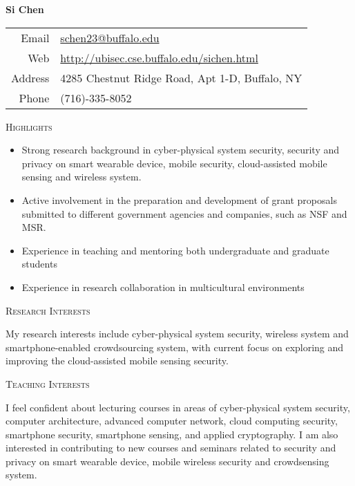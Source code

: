 \documentclass[letter]{article}
\newcommand{\heading}[1]{\item \large \textsc{#1} \normalsize}
\begin{document}
\Huge \textbf{Si Chen} \hfill \small
\begin{tabular}{rl}
Email   & \href{mailto:schen23@buffalo.edu}{schen23@buffalo.edu} \\
Web     & \url{http://ubisec.cse.buffalo.edu/sichen.html} \\
Address & 4285 Chestnut Ridge Road, Apt 1-D, Buffalo, NY\\
Phone  & (716)-335-8052\\
\end{tabular}

\normalsize

\begin{description}

\heading{Highlights}
\begin{itemize}
\item Strong research background in cyber-physical system security, security and privacy on smart wearable device, mobile security, cloud-assisted mobile sensing and wireless system.

\item Active involvement in the preparation and development of grant proposals submitted to different government agencies and companies, such as NSF and MSR.
\item Experience in teaching and mentoring both undergraduate and graduate students
\item Experience in research collaboration in multicultural environments
\end{itemize}


\heading{Research Interests}

My research interests include cyber-physical system security, wireless system and smartphone-enabled crowdsourcing system,  with current focus on exploring and improving the cloud-assisted mobile sensing security. \\

\heading{Teaching Interests}

I feel confident about lecturing courses in areas of cyber-physical system security, computer architecture, advanced computer network, cloud computing security, smartphone security, smartphone sensing, and applied cryptography. I am also interested in contributing to new courses and seminars related to security and privacy on smart wearable device, mobile wireless security and crowdsensing system.




\end{description}
\end{document}
